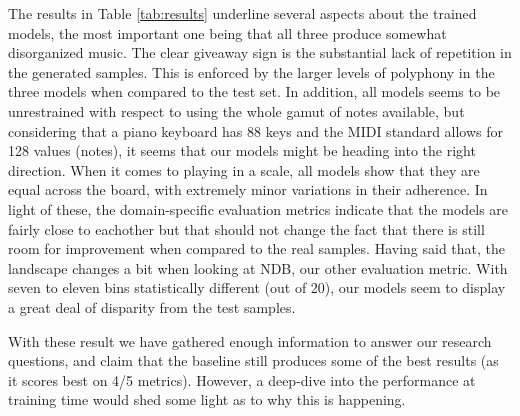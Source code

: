 \documentclass[a4paper]{book}
\begin{document}
The results in Table \ref{tab:results} underline several aspects about the trained models, the most important one being that all three produce somewhat disorganized music. The clear giveaway sign is the substantial lack of repetition in the generated samples. This is enforced by the larger levels of polyphony in the three models when compared to the test set. In addition, all models seems to be unrestrained with respect to using the whole gamut of notes available, but considering that a piano keyboard has 88 keys and the MIDI standard allows for 128 values (notes), it seems that our models might be heading into the right direction. When it comes to playing in a scale, all models show that they are equal across the board, with extremely minor variations in their adherence. In light of these, the domain-specific evaluation metrics indicate that the models are fairly close to eachother but that should not change the fact that there is still room for improvement when compared to the real samples. Having said that, the landscape changes a bit when looking at NDB, our other evaluation metric. With seven to eleven bins statistically different (out of 20), our models seem to display a great deal of disparity from the test samples.

With these result we have gathered enough information to answer our research questions, and claim that the baseline still produces some of the best results (as it scores best on 4/5 metrics). However, a deep-dive into the performance at training time would shed some light as to why this is happening.
\end{document}

